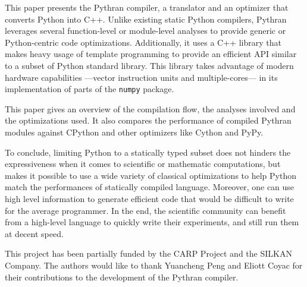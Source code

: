 \documentclass[10pt, onecolumn, preprint]{sigplanconf}
\begin{document}
This paper presents the Pythran compiler, a translator and an optimizer that
converts Python into C++. Unlike existing static Python compilers, Pythran
leverages several function-level or module-level analyses to provide
generic or Python-centric code optimizations. Additionally, it uses a C++
library that makes heavy usage of template programming to provide an efficient
API similar to a subset of Python standard library. This library takes
advantage of modern hardware capabilities ---vector instruction units and
multiple-cores--- in its implementation of parts of the \texttt{numpy} package.

This paper gives an overview of the compilation flow, the analyses involved and
the optimizations used. It also compares the performance of compiled Pythran
modules against CPython and other optimizers like Cython and PyPy.

To conclude, limiting Python to a statically typed subset does not hinders the
expressiveness when it comes to scientific or mathematic computations, but
makes it possible to use a wide variety of classical optimizations to help
Python match the performances of statically compiled language. Moreover, one
can use high level information to generate efficient code that would be
difficult to write for the average programmer. In the end, the scientific
community can benefit from a high-level language to quickly write their
experiments, and still run them at decent speed.



\acks


This project has been partially funded by the CARP Project and the SILKAN
Company.  The authors would like to thank Yuancheng Peng and Eliott Coyac for
their contributions to the development of the Pythran compiler.




\end{document}
